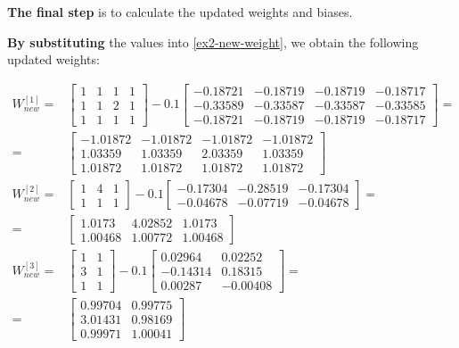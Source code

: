 \documentclass[12pt]{article}
\begin{document}
\begin{enumerate}[leftmargin=\labelsep]
          \textbf{The final step} is to calculate the updated weights and biases.

          \textbf{By substituting} the values into \eqref{ex2-new-weight}, we obtain the following updated weights:

          \vskip -0.2cm
          \begin{align*}
              W^{[1]}_{new} = & \begin{bmatrix} 1 & 1 & 1 & 1 \\ 1 & 1 & 2 & 1 \\ 1 & 1 & 1 & 1\end{bmatrix}
                - 0.1 \begin{bmatrix} -0.18721 & -0.18719 & -0.18719 & -0.18717 \\ -0.33589 & -0.33587 & -0.33587 & -0.33585 \\ -0.18721 & -0.18719 & -0.18719 & -0.18717 \end{bmatrix} = \\
                = & \begin{bmatrix} -1.01872 & -1.01872 & -1.01872 & -1.01872 \\ 1.03359 & 1.03359 & 2.03359 & 1.03359 \\ 1.01872 & 1.01872 & 1.01872 & 1.01872 \end{bmatrix} \\
              W^{[2]}_{new} = & \begin{bmatrix} 1 & 4 & 1 \\ 1 & 1 & 1 \end{bmatrix} -
                0.1 \begin{bmatrix} -0.17304 & -0.28519 & -0.17304\\ -0.04678 & -0.07719 & -0.04678 \end{bmatrix} = \\
                = & \begin{bmatrix} 1.0173 & 4.02852 & 1.0173 \\ 1.00468 & 1.00772 & 1.00468\end{bmatrix} \\
              W^{[3]}_{new} = & \begin{bmatrix} 1 & 1 \\ 3 & 1 \\ 1 & 1 \end{bmatrix} -
                0.1 \begin{bmatrix}  0.02964 & 0.02252 \\ -0.14314 & 0.18315 \\ 0.00287 & -0.00408 \end{bmatrix} = \\
                = & \begin{bmatrix} 0.99704 & 0.99775 \\ 3.01431 & 0.98169 \\ 0.99971 & 1.00041\end{bmatrix}
          \end{align*}


\end{enumerate}
\end{document}
